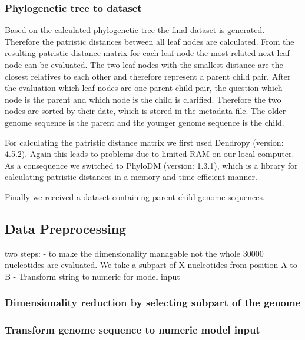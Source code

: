 \subsubsection{Phylogenetic tree to dataset}
\label{ch:approachAc}

Based on the calculated phylogenetic tree the final dataset is generated. Therefore the patristic distances between all leaf nodes are calculated. From the resulting patristic distance matrix for each leaf node the most related next leaf node can be evaluated. The two leaf nodes with the smallest distance are the closest relatives to each other and therefore represent a parent child pair. After the evaluation which leaf nodes are one parent child pair, the question which node is the parent and which node is the child is clarified. Therefore the two nodes are sorted by their date, which is stored in the metadata file. The older genome sequence is the parent and the younger genome sequence is the child.

For calculating the patristic distance matrix we first used Dendropy (version: 4.5.2). Again this leads to problems due to limited RAM on our local computer. As a consequence we switched to PhyloDM (version: 1.3.1), which is a library for calculating patristic distances in a memory and time efficient manner.

Finally we received a dataset containing parent child genome sequences.

\subsection{Data Preprocessing}  \label{ch:approachB}

two steps:
- to make the dimensionality managable not the whole 30000 nucleotides are evaluated. We take a subpart of X nucleotides from position A to B
- Transform string to numeric for model input

\subsubsection{Dimensionality reduction by selecting subpart of the genome}
\label{ch:approachBa}


\subsubsection{Transform genome sequence to numeric model input}
\label{ch:approachBb}


